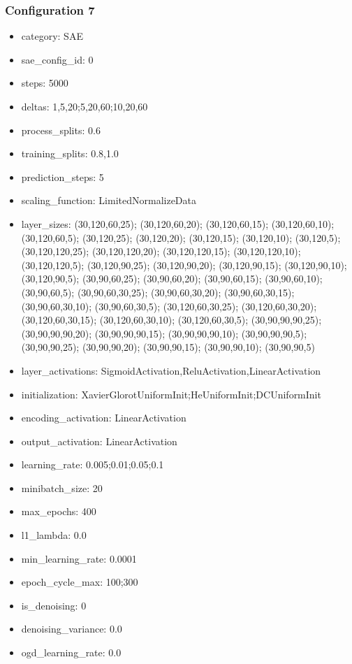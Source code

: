 \documentclass[a4paper,11pt,oneside]{article}
\theoremstyle{plain}
\theoremstyle{definition}
\begin{document}
\subsubsection{Configuration 7}\label{config7}
\begin{itemize}
	\item category: SAE
	\item sae\_config\_id: 0
	\item steps: 5000
	\item deltas: 1,5,20;5,20,60;10,20,60
	\item process\_splits: 0.6
	\item training\_splits: 0.8,1.0
	\item prediction\_steps: 5
	\item scaling\_function: LimitedNormalizeData
	\item layer\_sizes: (30,120,60,25); (30,120,60,20); (30,120,60,15); (30,120,60,10); (30,120,60,5); (30,120,25); (30,120,20); (30,120,15); (30,120,10); (30,120,5); (30,120,120,25); (30,120,120,20); (30,120,120,15); (30,120,120,10); (30,120,120,5); (30,120,90,25); (30,120,90,20); (30,120,90,15); (30,120,90,10); (30,120,90,5); (30,90,60,25); (30,90,60,20); (30,90,60,15); (30,90,60,10); (30,90,60,5); (30,90,60,30,25); (30,90,60,30,20); (30,90,60,30,15); (30,90,60,30,10); (30,90,60,30,5); (30,120,60,30,25); (30,120,60,30,20); (30,120,60,30,15); (30,120,60,30,10); (30,120,60,30,5); (30,90,90,90,25); (30,90,90,90,20); (30,90,90,90,15); (30,90,90,90,10); (30,90,90,90,5);(30,90,90,25); (30,90,90,20); (30,90,90,15); (30,90,90,10); (30,90,90,5)
	\item layer\_activations: SigmoidActivation,ReluActivation,LinearActivation
	\item initialization: XavierGlorotUniformInit;HeUniformInit;DCUniformInit
	\item encoding\_activation: LinearActivation
	\item output\_activation: LinearActivation
	\item learning\_rate: 0.005;0.01;0.05;0.1
	\item minibatch\_size: 20
	\item max\_epochs: 400
	\item l1\_lambda: 0.0
	\item min\_learning\_rate: 0.0001
	\item epoch\_cycle\_max: 100;300
	\item is\_denoising: 0
	\item denoising\_variance: 0.0
	\item ogd\_learning\_rate: 0.0
\end{itemize}
\end{document}
